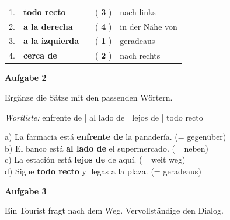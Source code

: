 \documentclass[11pt, a4paper]{article}
\newcommand{\fachfarbe}{spanisch}
\newcommand{\punktebox}[1]{\hfill\fbox{\small \_/#1}}
\newcommand{\loesung}[1]{\textcolor{loesung}{\textbf{#1}}}
\newenvironment{aufgabe}[1]{%
    \needspace{5\baselineskip}%
    \nopagebreak[4]%
    \vspace{10pt}
    \noindent\textbf{\textcolor{\fachfarbe}{Aufgabe #1}}
    \nopagebreak[4]%
    \vspace{5pt}
    \nopagebreak[4]%
    \begin{list}{}{\leftmargin=0pt}
    \item[]
}{%
    \end{list}
}
\newcommand{\es}[1]{\textcolor{\fachfarbe}{\textbf{#1}}}
\begin{document}
\begin{center}
\begin{tabular}{rlcrl}
1. & \es{todo recto} & \hspace{2cm} & ( \loesung{3} ) & nach links \\[0.6em]
2. & \es{a la derecha} & & ( \loesung{4} ) & in der Nähe von \\[0.6em]
3. & \es{a la izquierda} & & ( \loesung{1} ) & geradeaus \\[0.6em]
4. & \es{cerca de} & & ( \loesung{2} ) & nach rechts \\
\end{tabular}
\end{center}

\vspace{15pt}


\begin{aufgabe}{2}
Ergänze die Sätze mit den passenden Wörtern. \punktebox{4}
\end{aufgabe}

\begin{vokabelkasten}
\textit{Wortliste:} enfrente de | al lado de | lejos de | todo recto
\end{vokabelkasten}

\vspace{0.5em}

\noindent
a) La farmacia está \es{\loesung{enfrente de}} la panadería. (= gegenüber) \\[0.8em]
b) El banco está \es{\loesung{al lado de}} el supermercado. (= neben) \\[0.8em]
c) La estación está \es{\loesung{lejos de}} de aquí. (= weit weg) \\[0.8em]
d) Sigue \es{\loesung{todo recto}} y llegas a la plaza. (= geradeaus)

\vspace{15pt}


\begin{aufgabe}{3}
Ein Tourist fragt nach dem Weg. Vervollständige den Dialog. \punktebox{6}
\end{aufgabe}
\end{document}
